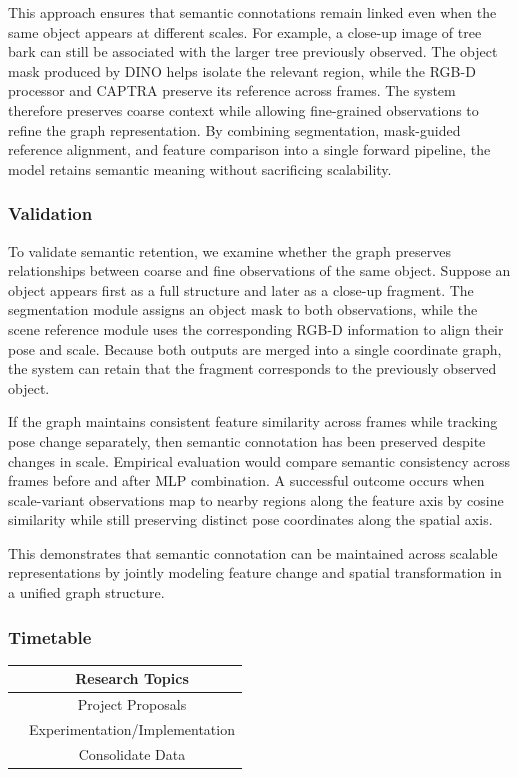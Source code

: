 \documentclass[11pt, oneside]{article}     %
\begin{document}
This approach ensures that semantic connotations remain linked even when the same object appears at different scales. For example, a close-up image of tree bark can still be associated with the larger tree previously observed. The object mask produced by DINO helps isolate the relevant region, while the RGB-D processor and CAPTRA preserve its reference across frames. The system therefore preserves coarse context while allowing fine-grained observations to refine the graph representation. By combining segmentation, mask-guided reference alignment, and feature comparison into a single forward pipeline, the model retains semantic meaning without sacrificing scalability.

\subsubsection{Validation}


To validate semantic retention, we examine whether the graph preserves relationships between coarse and fine observations of the same object. Suppose an object appears first as a full structure and later as a close-up fragment. The segmentation module assigns an object mask to both observations, while the scene reference module uses the corresponding RGB-D information to align their pose and scale. Because both outputs are merged into a single coordinate graph, the system can retain that the fragment corresponds to the previously observed object. 

If the graph maintains consistent feature similarity across frames while tracking pose change separately, then semantic connotation has been preserved despite changes in scale. Empirical evaluation would compare semantic consistency across frames before and after MLP combination. A successful outcome occurs when scale-variant observations map to nearby regions along the feature axis by cosine similarity while still preserving distinct pose coordinates along the spatial axis.

This demonstrates that semantic connotation can be maintained across scalable representations by jointly modeling feature change and spatial transformation in a unified graph structure.

\subsubsection{Timetable}

\begin{center}
  \begin{tabularx}{0.8\textwidth}{|X|c|}
    \hline
    \centering{Weeks 1 - 3} & Research Topics \\
    \hline
    \centering{Weeks 4 - 5} & Project Proposals \\
    \hline
    \centering{Weeks 6 - 10} & Experimentation/Implementation  \\
    \hline 
    \centering{Weeks 11 - 12} & Consolidate Data \\
    \hline
  \end{tabularx}
\end{center}
\end{document}
